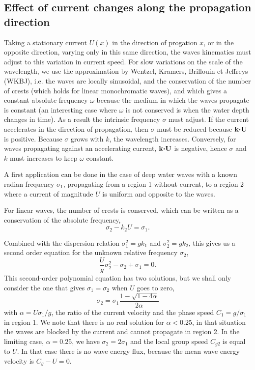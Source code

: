 \subsection{Effect of current changes along the propagation direction}\label{section:bunching}
Taking a stationary current  $U(x)$ in the direction of progation $x$, or in the opposite direction, varying only in this same direction, 
the waves kinematics must adjust to this variation in current speed. 
For slow variations on the scale of the wavelength, we use the approximation by Wentzel, Kramers,
Brillouin et Jeffreys (WKBJ), i.e. the waves are locally sinusoidal, and the conservation of the number of crests (which holds for linear monochromatic waves), and which gives a constant absolute frequency $\omega$ because the medium in which the 
waves propagate is constant (an interesting case where $\omega$ is not conserved is when the water depth changes in time). 
As a result the intrinsic frequency $\sigma$ must adjust. If the current accelerates in the direction of propagation, then $\sigma$ must be 
reduced because $\mathbf{k} \mbox{\boldmath $\cdot$} \mathbf{U}$ is positive. Because 
 $\sigma$ grows with $k$, the wavelength increases.
Conversely, for waves propagating against an accelerating current, $\mathbf{k} \mbox{\boldmath $\cdot$}
\mathbf{U}$ is negative, hence $\sigma$ and $k$ must increases to keep $\omega$ constant.

A first application can be done in the case of deep water waves with a known 
radian frequency $\sigma_1$, propagating from a region 1
without current, to a region 2 where a current of magnitude $U$ is uniform and opposite to the waves. 

For linear waves, the number of crests is conserved, which can be written as a conservation 
of the absolute frequency,
\begin{equation}
 \sigma_2 - k_2 U = \sigma_1.
\end{equation}

Combined with the dispersion relation $\sigma_1^2 = g k_1$ and $\sigma_2^2 = g k_2$, this gives us 
a second order equation for the unknown relative frequency $\sigma_2$, 
\begin{equation}
 \frac{U}{g} \sigma_2^2 -\sigma_2 + \sigma_1 = 0.
\end{equation}
This second-order polynomial equation has two solutions, but we shall only consider the one that gives 
$\sigma_1 = \sigma_2$ when $U$ goes to zero, 
\begin{equation}
 \sigma_2 =  \sigma_1 \frac{1 - \sqrt{1-4\alpha}}{2 \alpha }
\end{equation}
with $\alpha =  U \sigma_1 / g$, the ratio of the current velocity and the phase speed $C_1=g/\sigma_1$ in region 1.
We note that there is no real solution for $\alpha < 0.25$, in that situation the waves are blocked by the current 
and cannot propagate in region 2. In the limiting case, $\alpha = 0.25$, we have $\sigma_2 = 2 \sigma_1$ and the 
local group speed $C_{g2}$ is equal to $U$. In that case there is no wave energy flux, because the 
mean wave energy velocity is $C_g-U=0$. 

